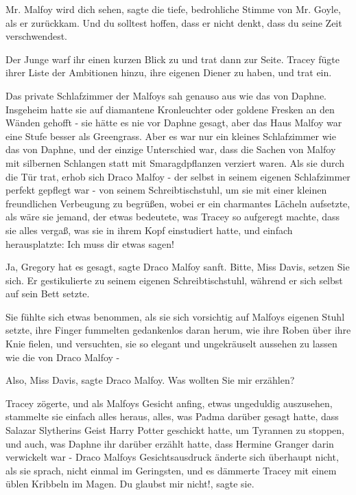 \glqq{}Mr. Malfoy wird dich sehen\grqq{}, sagte die tiefe, bedrohliche Stimme von
Mr. Goyle, als er zurückkam. \glqq{}Und du solltest hoffen, dass er nicht denkt,
dass du seine Zeit verschwendest.\grqq{}

Der Junge warf ihr einen kurzen Blick zu und trat dann zur Seite. Tracey fügte
ihrer Liste der Ambitionen hinzu, ihre eigenen Diener zu haben, und trat ein.

Das private Schlafzimmer der Malfoys sah genauso aus wie das von Daphne.
Insgeheim hatte sie auf diamantene Kronleuchter oder goldene Fresken an den
Wänden gehofft - sie hätte es nie vor Daphne gesagt, aber das Haus Malfoy war
eine Stufe besser als Greengrass. Aber es war nur ein kleines Schlafzimmer wie
das von Daphne, und der einzige Unterschied war, dass die Sachen von Malfoy mit
silbernen Schlangen statt mit Smaragdpflanzen verziert waren. Als sie durch die
Tür trat, erhob sich Draco Malfoy - der selbst in seinem eigenen Schlafzimmer
perfekt gepflegt war - von seinem Schreibtischstuhl, um sie mit einer kleinen
freundlichen Verbeugung zu begrüßen, wobei er ein charmantes Lächeln aufsetzte,
als wäre sie jemand, der etwas bedeutete, was Tracey so aufgeregt machte, dass
sie alles vergaß, was sie in ihrem Kopf einstudiert hatte, und einfach
herausplatzte: \glqq{}Ich muss dir etwas sagen!\grqq{}

\glqq{}Ja, Gregory hat es gesagt\grqq{}, sagte Draco Malfoy sanft. \glqq{}Bitte,
Miss Davis, setzen Sie sich.\grqq{} Er gestikulierte zu seinem eigenen
Schreibtischstuhl, während er sich selbst auf sein Bett setzte.

Sie fühlte sich etwas benommen, als sie sich vorsichtig auf Malfoys eigenen
Stuhl setzte, ihre Finger fummelten gedankenlos daran herum, wie ihre Roben über
ihre Knie fielen, und versuchten, sie so elegant und ungekräuselt aussehen zu
lassen wie die von Draco Malfoy -

\glqq{}Also, Miss Davis\grqq{}, sagte Draco Malfoy. \glqq{}Was wollten Sie mir
erzählen?\grqq{}

Tracey zögerte, und als Malfoys Gesicht anfing, etwas ungeduldig auszusehen,
stammelte sie einfach alles heraus, alles, was Padma darüber gesagt hatte, dass
Salazar Slytherins Geist Harry Potter geschickt hatte, um Tyrannen zu stoppen,
und auch, was Daphne ihr darüber erzählt hatte, dass Hermine Granger darin
verwickelt war - Draco Malfoys Gesichtsausdruck änderte sich überhaupt nicht,
als sie sprach, nicht einmal im Geringsten, und es dämmerte Tracey mit einem
üblen Kribbeln im Magen. \glqq{}Du glaubst mir nicht!\grqq{}, sagte sie.


